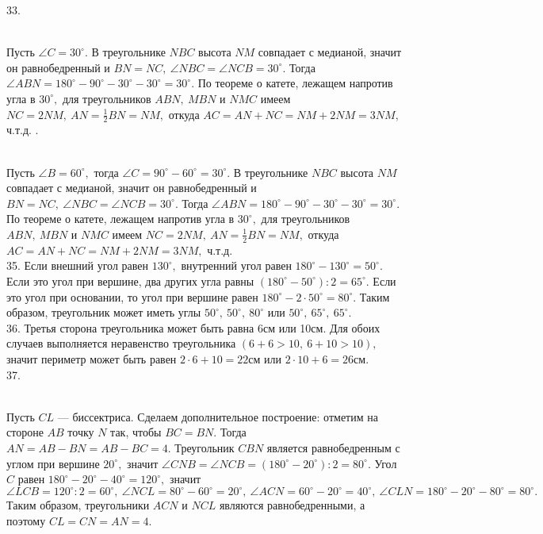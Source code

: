 33. \begin{figure}[ht!]
\end{figure}\\
Пусть $\angle C=30^\circ.$ В треугольнике $NBC$ высота $NM$ совпадает с медианой, значит он равнобедренный и $BN=NC,\ \angle NBC=\angle NCB=30^\circ.$ Тогда $\angle ABN=180^\circ-90^\circ-30^\circ-30^\circ=30^\circ.$ По теореме о катете, лежащем напротив угла в $30^\circ,$ для треугольников $ABN,\ MBN$ и $NMC$ имеем $NC=2NM,\ AN=\frac{1}{2}BN=NM,$ откуда $AC=AN+NC=NM+2NM=3NM,$ ч.т.д.\newpage
{}. \begin{figure}[ht!]
\end{figure}\\
Пусть $\angle B=60^\circ,$ тогда $\angle C=90^\circ-60^\circ=30^\circ.$ В треугольнике $NBC$ высота $NM$ совпадает с медианой, значит он равнобедренный и $BN=NC,\ \angle NBC=\angle NCB=30^\circ.$ Тогда $\angle ABN=180^\circ-90^\circ-30^\circ-30^\circ=30^\circ.$ По теореме о катете, лежащем напротив угла в $30^\circ,$ для треугольников $ABN,\ MBN$ и $NMC$ имеем $NC=2NM,\ AN=\frac{1}{2}BN=NM,$ откуда $AC=AN+NC=NM+2NM=3NM,$ ч.т.д.\\
35. Если внешний угол равен $130^\circ,$ внутренний угол равен $180^\circ-130^\circ=50^\circ.$ Если это угол при вершине, два других угла равны $(180^\circ-50^\circ):2=65^\circ.$ Если это угол при основании, то угол при вершине равен $180^\circ-2\cdot50^\circ=80^\circ.$ Таким образом, треугольник может иметь углы  $50^\circ,\ 50^\circ,\ 80^\circ$ или $50^\circ,\ 65^\circ,\ 65^\circ.$\\
36. Третья сторона треугольника может быть равна 6см или 10см. Для обоих случаев выполняется неравенство треугольника $(6+6>10,\ 6+10>10),$ значит периметр может быть равен $2\cdot6+10=22$см или $2\cdot10+6=26$см.\\
37. \begin{figure}[ht!]
\end{figure}\\
Пусть $CL$ --- биссектриса. Сделаем дополнительное построение: отметим на стороне $AB$ точку $N$ так, чтобы $BC=BN.$ Тогда $AN=AB-BN=AB-BC=4.$ Треугольник $CBN$ является равнобедренным с углом при вершине $20^\circ,$ значит $\angle CNB=\angle NCB=(180^\circ-20^\circ):2=80^\circ.$ Угол $C$ равен $180^\circ-20^\circ-40^\circ=120^\circ,$ значит $\angle LCB=120^\circ:2=60^\circ,\ \angle NCL=80^\circ-60^\circ=20^\circ,\ \angle ACN=60^\circ-20^\circ=40^\circ,\ \angle CLN=180^\circ-20^\circ-80^\circ=80^\circ.$ Таким образом, треугольники $ACN$ и $NCL$ являются равнобедренными, а поэтому $CL=CN=AN=4.$\\
